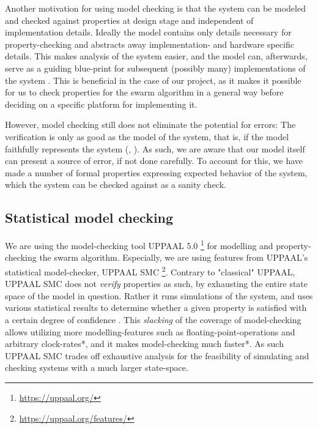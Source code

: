 Another motivation for using model checking is that the system can be modeled and checked against properties at design stage and independent of implementation details. Ideally the model contains only details necessary for property-checking and abstracts away implementation- and hardware specific details. This makes analysis of the system easier, and the model can, afterwards, serve as a guiding blue-print for subsequent (possibly many) implementations of the system \parencite[pp. 145-146]{Brambilla}. This is beneficial in the case of our project, as it makes it possible for us to check properties for the swarm algorithm in a general way before deciding on a specific platform for implementing it.

However, model checking still does not eliminate the potential for errors: The verification is only as good as the model of the system, that is, if the model faithfully represents the system (\cite[pp. 145-146]{Brambilla}, \cite[p. 8]{Baier_Katoen_2008}). As such, we are aware that our model itself can present a source of error, if not done carefully. To account for this, we have made a number of formal properties expressing expected behavior of the system, which the system can be checked against as a sanity check. 




\subsection{Statistical model checking}
We are using the model-checking tool UPPAAL 5.0 \footnote{\url{https://uppaal.org/}} for modelling and property-checking the swarm algorithm. Especially, we are using features from UPPAAL's statistical model-checker, UPPAAL SMC \footnote{\url{https://uppaal.org/features/}}. Contrary to "classical" UPPAAL, UPPAAL SMC does not \textit{verify} properties as such, by exhausting the entire state space of the model in question. Rather it runs simulations of the system, and uses various statistical results to determine whether a given property is satisfied with a certain degree of confidence \parencite[p. 398]{UPPAALSMC}. This \textit{slacking} of the coverage of model-checking allows utilizing more modelling-features such as floating-point-operations and arbitrary clock-rates*, and it makes model-checking much faster*. As such UPPAAL SMC trades off exhaustive analysis for the feasibility of simulating and checking systems with a much larger state-space. 


